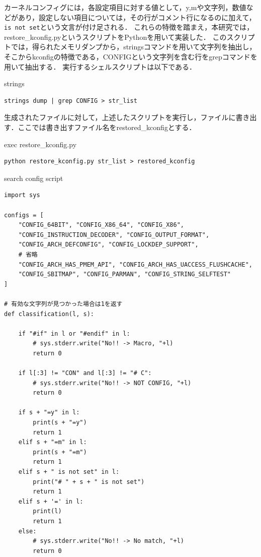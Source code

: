 カーネルコンフィグには，各設定項目に対する値として，y,mや文字列，数値などがあり，設定しない項目については，その行がコメント行になるのに加えて，\verb|is not set|という文言が付け足される．
これらの特徴を踏まえ，本研究では，restore_kconfig.pyというスクリプトをPythonを用いて実装した．
このスクリプトでは，得られたメモリダンプから，stringsコマンドを用いて文字列を抽出し，そこからkconfigの特徴である，CONFIGという文字列を含む行をgrepコマンドを用いて抽出する．
実行するシェルスクリプトは以下である．

\begin{itembox}[l]{strings}
    \begin{verbatim}
strings dump | grep CONFIG > str_list
    \end{verbatim}
\end{itembox}

生成されたファイルに対して，上述したスクリプトを実行し，ファイルに書き出す．ここでは書き出すファイル名をrestored\_kconfigとする．

\begin{itembox}[l]{exec restore_kconfig.py}
    \begin{verbatim}
python restore_kconfig.py str_list > restored_kconfig
    \end{verbatim}
\end{itembox}

\begin{itembox}[l]{search config script}
    \begin{verbatim}
import sys

configs = [
    "CONFIG_64BIT", "CONFIG_X86_64", "CONFIG_X86",
    "CONFIG_INSTRUCTION_DECODER", "CONFIG_OUTPUT_FORMAT",
    "CONFIG_ARCH_DEFCONFIG", "CONFIG_LOCKDEP_SUPPORT",
    # 省略
    "CONFIG_ARCH_HAS_PMEM_API", "CONFIG_ARCH_HAS_UACCESS_FLUSHCACHE",
    "CONFIG_SBITMAP", "CONFIG_PARMAN", "CONFIG_STRING_SELFTEST"
]

# 有効な文字列が見つかった場合は1を返す
def classification(l, s):

    if "#if" in l or "#endif" in l:
        # sys.stderr.write("No!! -> Macro, "+l)
        return 0

    if l[:3] != "CON" and l[:3] != "# C":
        # sys.stderr.write("No!! -> NOT CONFIG, "+l)
        return 0

    if s + "=y" in l:
        print(s + "=y")
        return 1
    elif s + "=m" in l:
        print(s + "=m")
        return 1
    elif s + " is not set" in l:
        print("# " + s + " is not set")
        return 1
    elif s + '=' in l:
        print(l)
        return 1
    else:
        # sys.stderr.write("No!! -> No match, "+l)
        return 0

    \end{verbatim}
\end{itembox}

